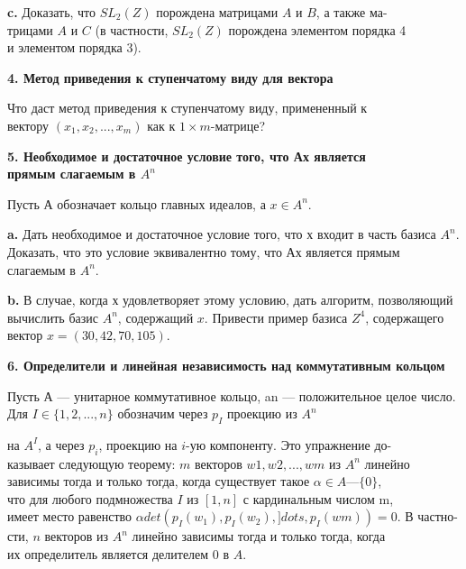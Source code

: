 \medskip

{\bf c.} Доказать, что $SL_2(\mathit{Z})$ порождена матрицами $A$ и $B$, а также 
ма-\\трицами $A$ и $C$ (в частности, $SL_2(\mathit{Z})$ порождена элементом порядка 4\\ 
и элементом порядка 3). 

\medskip

{\noindent\bf 4. Метод приведения к ступенчатому виду для вектора }

Что даст метод приведения к ступенчатому виду, примененный к\\ 
вектору $ (x_1,x_2,...,x_m) $ как к $1 \times m$-матрице? 

\medskip

{\noindent\bf 5. Необходимое и достаточное условие того, что Ах является \\
прямым слагаемым в $A^n$}

\medskip

Пусть А обозначает кольцо главных идеалов, а $x \in A^n  $.

\medskip

{\bf a.} Дать необходимое и достаточное условие того, что х входит в 
часть базиса $A^n$. Доказать, что это условие эквивалентно тому, что Ах 
является прямым слагаемым в $A^n$.

\medskip

{\bf b.} В случае, когда х удовлетворяет этому условию, дать алгоритм, 
позволяющий вычислить базис $A^n$, содержащий $x$. Привести пример 
базиса $\mathit{Z}^4$, содержащего вектор $x = (30,42,70,105)$. 

\medskip

{\noindent\bf 6. Определители и линейная независимость
над коммутативным кольцом }

\medskip

Пусть А — унитарное коммутативное кольцо, an — положительное 
целое число. Для $I \in \{1,2,..., n\}$ обозначим через $p_I$ проекцию из $A^n$

\pagebreak

\noindent на $A^I$, а через $p_i$, проекцию на $\mathit{i}$-ую компоненту. Это упражнение до-\\казывает следующую теорему: $m$ векторов $ w1, w2,..., wm$ из $A^n$ линейно\\ 
зависимы тогда и только тогда, когда существует такое $\alpha \in A — \{0\}$,\\ что для любого подмножества $I$ из $[1,n]$ с кардинальным числом m,\\ 
имеет место равенство $\alpha det(p_I(w_1),p_I(w_2),]dots ,p_I( wm)) = 0$. В 
частно-\\сти, $n$ векторов из $A^n$ линейно зависимы тогда и только тогда, когда\\ 
их определитель является делителем 0 в $A$.

